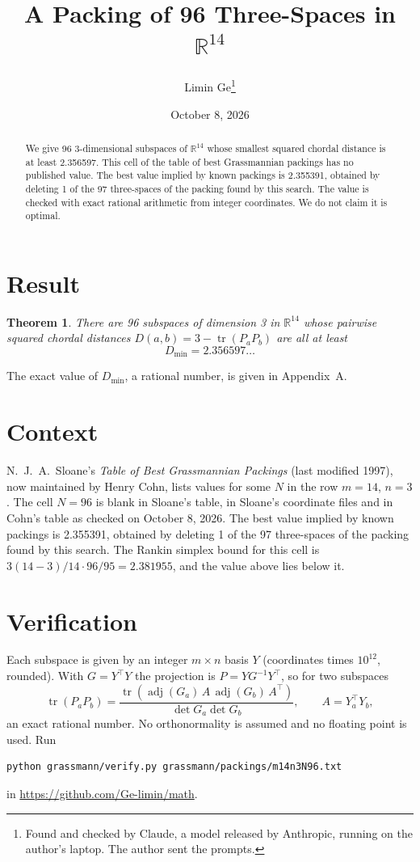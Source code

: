 \documentclass[11pt,a4paper]{article}
\title{A Packing of 96 Three-Spaces in $\mathbb{R}^{14}$}
\author{Limin Ge\thanks{Found and checked by Claude, a model released by Anthropic, running on the author's laptop. The author sent the prompts.}}
\date{October 8, 2026}
\newtheorem*{theorem}{Theorem}
\begin{document}
\maketitle
\begin{abstract}
We give 96 3-dimensional subspaces of $\mathbb{R}^{14}$ whose smallest squared chordal distance is at least 2.356597. This cell of the table of best Grassmannian packings has no published value. The best value implied by known packings is 2.355391, obtained by deleting 1 of the 97 three-spaces of the packing found by this search. The value is checked with exact rational arithmetic from integer coordinates. We do not claim it is optimal.
\end{abstract}

\section{Result}
\begin{theorem}
There are 96 subspaces of dimension 3 in $\mathbb{R}^{14}$ whose pairwise squared chordal distances $D(a,b) = 3 - \operatorname{tr}(P_aP_b)$ are all at least
\[ D_{\min} = 2.356597\ldots \]
\end{theorem}
The exact value of $D_{\min}$, a rational number, is given in Appendix~A.


\section{Context}
N.~J.~A.~Sloane's \emph{Table of Best Grassmannian Packings} (last modified 1997), now maintained by Henry Cohn, lists values for some $N$ in the row $m=14$, $n=3$. The cell $N=96$ is blank in Sloane's table, in Sloane's coordinate files and in Cohn's table as checked on October 8, 2026. The best value implied by known packings is 2.355391, obtained by deleting 1 of the 97 three-spaces of the packing found by this search. The Rankin simplex bound for this cell is $3(14-3)/14\cdot 96/95 = 2.381955$, and the value above lies below it.


\section{Verification}
Each subspace is given by an integer $m\times n$ basis $Y$ (coordinates times $10^{12}$, rounded). With $G=Y^\top Y$ the projection is $P=YG^{-1}Y^\top$, so for two subspaces
\[ \operatorname{tr}(P_aP_b)=\frac{\operatorname{tr}(\operatorname{adj}(G_a)\,A\,\operatorname{adj}(G_b)\,A^\top)}{\det G_a\det G_b},\qquad A=Y_a^\top Y_b, \]
an exact rational number. No orthonormality is assumed and no floating point is used. Run
\begin{verbatim}
python grassmann/verify.py grassmann/packings/m14n3N96.txt
\end{verbatim}
in \url{https://github.com/Ge-limin/math}.
\end{document}
